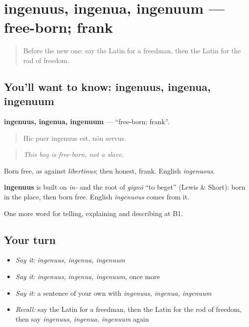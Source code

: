 \section[ingenuus, ingenua, ingenuum]{ingenuus, ingenua, ingenuum — free-born; frank}

\label{lesson:LA-C532-ingenuus}



\begin{quote}
Before the new one: say the Latin for a freedman, then the Latin for the rod of freedom.
\end{quote}

\subsection*{You'll want to know: ingenuus, ingenua, ingenuum}
\textbf{ingenuus, ingenua, ingenuum} — \textquotedblleft{}free-born; frank\textquotedblright{}.

\begin{quote}
Hic puer ingenuus est, nōn servus.
\end{quote}

\begin{quote}
\emph{This boy is free-born, not a slave.}
\end{quote}

Born free, as against \emph{lībertīnus}; then honest, frank. English \emph{ingenuous}.

\begin{cousinweb}
\textbf{ingenuus} is built on \emph{in-} and the root of \emph{gignō} \textquotedblleft{}to beget\textquotedblright{} (Lewis \& Short): born in the place, then born free. English \emph{ingenuous} comes from it.
\end{cousinweb}

\begin{grammarlens}[title={What you've built}]
One more word for telling, explaining and describing at B1.
\end{grammarlens}

\subsection*{Your turn}
\begin{itemize}
\raggedright
  \item \emph{Say it:} \emph{ingenuus, ingenua, ingenuum}
  \item \emph{Say it:} \emph{ingenuus, ingenua, ingenuum}, once more
  \item \emph{Say it:} a sentence of your own with \emph{ingenuus, ingenua, ingenuum}
  \item \emph{Recall:} say the Latin for a freedman, then the Latin for the rod of freedom, then say \emph{ingenuus, ingenua, ingenuum} again
\end{itemize}

